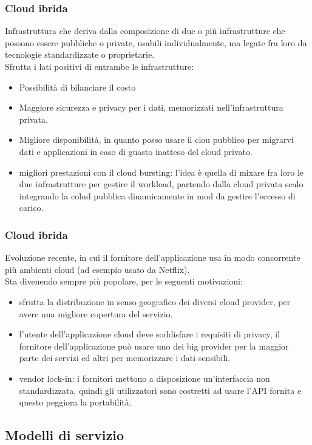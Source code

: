 \documentclass[16px]{article}
\begin{document}
\subsubsection{Cloud ibrida}
Infrastruttura che deriva dalla composizione di due o più infrastrutture che possono essere pubbliche o private, usabili individualmente, ma legate fra loro da tecnologie standardizzate o proprietarie.\\ Sfrutta i lati positivi di entrambe le infrastrutture:
\begin{itemize}
\item Possibilità di bilanciare il costo
\item Maggiore sicurezza e privacy per i dati, memorizzati nell'infrastruttura privata.
\item Migliore disponibilità, in quanto posso usare il clou pubblico per migrarvi dati e applicazioni in caso di guasto inatteso del cloud privato.
\item migliori prestazioni con il cloud bursting: l'idea è quella di mixare fra loro le due infrastrutture per gestire il workload, partendo dalla cloud privata scalo integrando la colud pubblica dinamicamente in mod da gestire l'eccesso di carico. 
\end{itemize}
\subsubsection{Cloud ibrida}
Evoluzione recente, in cui il fornitore dell'applicazione usa in modo concorrente più ambienti cloud (ad esempio usato da Netflix). \\Sta divenendo sempre più popolare, per le seguenti motivazioni:
\begin{itemize}
\item sfrutta la distribuzione in senso geografico dei diversi cloud provider, per avere una migliore copertura del servizio.
\item l'utente dell'applicazione cloud deve soddisfare i requisiti di privacy, il fornitore dell'applicazione può usare uno dei big provider per la maggior parte dei servizi ed altri per memorizzare i dati sensibili.
\item vendor lock-in: i fornitori mettono a disposizione un'interfaccia non standardizzata, quindi gli utilizzatori sono costretti ad usare l'API fornita e questo peggiora la portabilità.
\end{itemize}
\subsection{Modelli di servizio}
\end{document}
